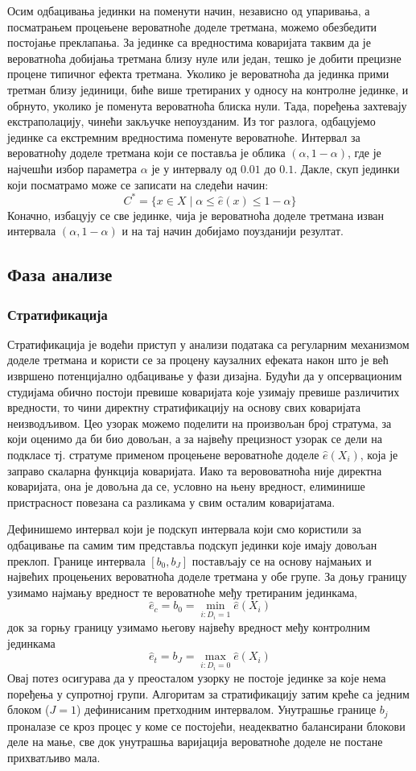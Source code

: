 \documentclass[12pt, a4paper]{article}
\begin{document}
Осим одбацивања јединки на поменути начин, независно од упаривања, а посматрањем процењене вероватноће доделе третмана, можемо обезбедити постојање преклапања. За јединке са вредностима коваријата таквим да је вероватноћа добијања третмана близу нуле или један, тешко је добити прецизне процене типичног ефекта третмана. Уколико је вероватноћа да јединка прими третман близу јединици, биће више третираних у односу на контролне јединке, и обрнуто, уколико је поменута вероватноћа блиска нули. Тада, поређења захтевају екстраполацију, чинећи закључке непоузданим. Из тог разлога, одбацујемо јединке са екстремним вредностима поменуте вероватноће. Интервал за вероватноћу доделе третмана који се поставља је облика $(\alpha, 1-\alpha)$, где је најчешћи избор параметра $\alpha$ је у интервалу од $0.01$ до $0.1$. Дакле, скуп јединки који посматрамо може се записати на следећи начин:  
$$
C^* = \{ x \in X \mid \alpha \le \hat e(x) \le 1 - \alpha \}
$$
Коначно, избацују се све јединке, чија је вероватноћа доделе третмана изван интервала  $(\alpha, 1-\alpha)$ и на тај начин добијамо поузданији резултат.
\subsection{Фаза анализе}
\subsubsection{Стратификација}
Стратификација је водећи приступ у анализи података са регуларним механизмом доделе третмана и користи се за процену каузалних ефеката након што је већ извршено потенцијално одбацивање у фази дизајна. 
Будући да у опсервационим студијама обично постоји превише коваријата које узимају превише различитих вредности, то чини директну стратификацију на основу свих коваријата неизводљивом. Цео узорак можемо поделити на произвољан број стратума, за који оценимо да би био довољан, а за највећу прецизност узорак се дели на подкласе тј. стратуме применом процењене вероватноће доделе $ \hat{e}(X_i)$, која је заправо скаларна функција коваријата. Иако та верововатноћа није директна коваријата, она је довољна да се, условно на њену вредност, елиминише пристрасност повезана са разликама у свим осталим коваријатама.

Дефинишемо интервал који је подскуп интервала који смо користили за одбацивање па самим тим представља подскуп јединки које имају довољан преклоп.
Границе интервала $[b_0, b_J]$ постављају се на основу најмањих и највећих процењених вероватноћа доделе третмана у обе групе.  За доњу границу узимамо најмању вредност те вероватноће међу третираним јединкама, $$\hat{e}_c = b_0 = \min_{i: D_i = 1} \hat{e}(X_i)$$ док за горњу границу узимамо његову највећу вредност међу контролним јединкама $$\hat{e}_t = b_J = \max_{i: D_i = 0} \hat{e}(X_i)$$ Овај потез осигурава да у преосталом узорку не постоје јединке за које нема поређења у супротној групи. Алгоритам за стратификацију затим креће са једним блоком ($J=1$) дефинисаним претходним интервалом. Унутрашње границе $b_j$ проналазе се кроз процес у коме се постојећи, неадекватно балансирани блокови деле на мање, све док унутрашња варијација вероватноће доделе не постане прихватљиво мала.
\end{document}
